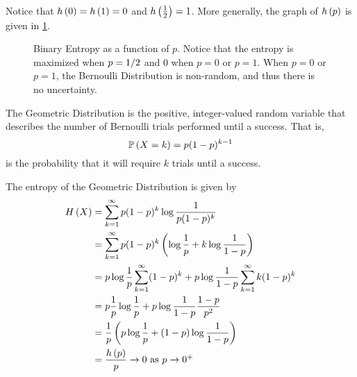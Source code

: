 Notice that $h\left(0\right) = h\left(1\right) = 0$ and $h\left(\frac{1}{2}\right) = 1$.
More generally, the graph of $h\left(p\right)$ is given in \cref{fig:binentryopy}.

\begin{figure}
    \centering
    \caption{Binary Entropy as a function of $p$. Notice that the entropy is
        maximized when $p = 1/2$ and 0 when $p = 0$ or $p = 1$. When $p = 0$
        or $p = 1$, the Bernoulli Distribution is non-random, and thus there is no
        uncertainty.}
    \label{fig:binentryopy}
\end{figure}

\begin{example}
    The Geometric Distribution is the positive, integer-valued random variable
    that describes the number of Bernoulli trials performed until a success. That
    is,
    \[\prob{X = k} = p(1 - p)^{k - 1}\]
    is the probability that it will require $k$ trials until a success.

    The entropy of the Geometric Distribution is given by
    \begin{align*}H\left(X\right)
         & = \sum_{k = 1}^{\infty} p(1 - p)^k\log\frac{1}{p(1 - p)^k}                                              \\
         & = \sum_{k = 1}^{\infty} p(1 - p)^k\left(\log\frac{1}{p} + k\log\frac{1}{1 - p}\right)                   \\
         & = p\log\frac{1}{p}\sum_{k = 1}^{\infty} (1 - p)^k + p\log\frac{1}{1 - p}\sum_{k = 1}^{\infty}k(1 - p)^k \\
         & = p\frac{1}{p}\log\frac{1}{p} + p\log\frac{1}{1 - p}\frac{1 - p}{p^2}                                   \\
         & = \frac{1}{p}\left(p\log\frac{1}{p} + (1 - p)\log\frac{1}{1 - p}\right)                                 \\
         & = \frac{h\left(p\right)}{p} \to 0 \hbox{ as $p \to 0^+$}
    \end{align*}
\end{example}

